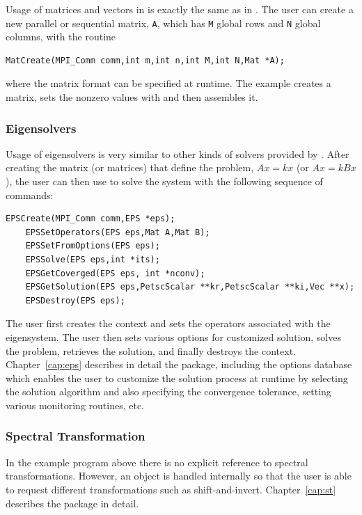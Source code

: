 Usage of matrices and vectors in \slepc is exactly the same as in \petsc.
The user can create a new parallel or sequential matrix, \texttt{A}, which
has \texttt{M} global rows and \texttt{N} global columns, with the routine
	\begin{Verbatim}[fontsize=\small]
	MatCreate(MPI_Comm comm,int m,int n,int M,int N,Mat *A);
	\end{Verbatim}
where the matrix format can be specified at runtime. The example creates a matrix, sets the nonzero values with  and then assembles it.

\subsubsection*{Eigensolvers}

Usage of eigensolvers is very similar to other kinds of solvers provided by \petsc.
After creating the matrix (or matrices) that define the problem,
$Ax = kx$ (or $Ax=kBx$), the user can then use  to solve the system 
with the following sequence of commands: 
 
  
	\begin{Verbatim}[fontsize=\small,numbers=none]
	EPSCreate(MPI_Comm comm,EPS *eps);
	EPSSetOperators(EPS eps,Mat A,Mat B);
	EPSSetFromOptions(EPS eps);
	EPSSolve(EPS eps,int *its);
	EPSGetCoverged(EPS eps, int *nconv);
	EPSGetSolution(EPS eps,PetscScalar **kr,PetscScalar **ki,Vec **x);
	EPSDestroy(EPS eps);
	\end{Verbatim}
The user first creates the  context and sets the operators
associated with the eigensystem. The user then sets various options for
customized solution, solves the problem, retrieves the solution, 
and finally destroys the  context.
Chapter~\ref{cap:eps} describes in detail the  package, including
the options database which enables the user to customize the solution
process at runtime by selecting the solution algorithm and also specifying the convergence tolerance, setting various monitoring routines, etc.

\subsubsection*{Spectral Transformation}

In the example program above there is no explicit reference to spectral transformations. However, an  object is handled internally so that the user is able to request different transformations such as shift-and-invert.
Chapter~\ref{cap:st} describes the  package in detail.

